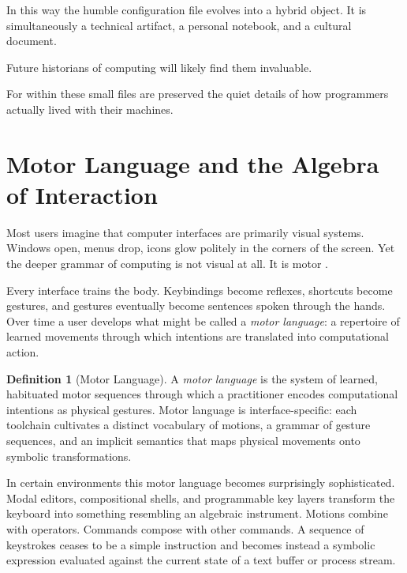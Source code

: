 \documentclass[11pt]{article}
\theoremstyle{definition}
\newtheorem{definition}{Definition}[section]
\begin{document}
In this way the humble configuration file evolves into a hybrid object.
It is simultaneously a technical artifact, a personal notebook, and a
cultural document.

Future historians of computing will likely find them invaluable.

For within these small files are preserved the quiet details of how
programmers actually lived with their machines.

\section{Motor Language and the Algebra of Interaction}

Most users imagine that computer interfaces are primarily visual systems.
Windows open, menus drop, icons glow politely in the corners of the
screen. Yet the deeper grammar of computing is not visual at all. It is
motor \cite{norman1988}.

Every interface trains the body. Keybindings become reflexes, shortcuts
become gestures, and gestures eventually become sentences spoken through
the hands. Over time a user develops what might be called a
\emph{motor language}: a repertoire of learned movements through which
intentions are translated into computational action.

\begin{definition}[Motor Language]
A \emph{motor language} is the system of learned, habituated motor
sequences through which a practitioner encodes computational intentions
as physical gestures. Motor language is interface-specific: each
toolchain cultivates a distinct vocabulary of motions, a grammar of
gesture sequences, and an implicit semantics that maps physical movements
onto symbolic transformations.
\end{definition}

In certain environments this motor language becomes surprisingly
sophisticated. Modal editors, compositional shells, and programmable
key layers transform the keyboard into something resembling an algebraic
instrument. Motions combine with operators. Commands compose with other
commands. A sequence of keystrokes ceases to be a simple instruction
and becomes instead a symbolic expression evaluated against the current
state of a text buffer or process stream.
\end{document}
